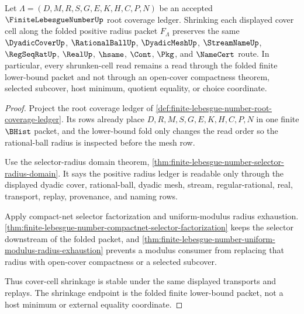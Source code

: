 \begin{theorem}
\label{thm:finite-lebesgue-number-cover-shrinkage-stability}
Let $\Lambda=(D,M,R,S,G,E,K,H,C,P,N)$ be an accepted $\FiniteLebesgueNumberUp$ root coverage ledger. Shrinking each displayed cover cell along the folded positive radius packet $F_\Lambda$ preserves the same $\DyadicCoverUp$, $\RationalBallUp$, $\DyadicMeshUp$, $\StreamNameUp$, $\RegSeqRatUp$, $\RealUp$, $\hsame$, $\Cont$, $\Pkg$, and $\NameCert$ route. In particular, every shrunken-cell read remains a read through the folded finite lower-bound packet and not through an open-cover compactness theorem, selected subcover, host minimum, quotient equality, or choice coordinate.
\end{theorem}
\begin{proof}
Project the root coverage ledger of \autoref{def:finite-lebesgue-number-root-coverage-ledger}. Its rows already place $D,R,M,S,G,E,K,H,C,P,N$ in one finite $\BHist$ packet, and the lower-bound fold only changes the read order so the rational-ball radius is inspected before the mesh row.

Use the selector-radius domain theorem, \autoref{thm:finite-lebesgue-number-selector-radius-domain}. It says the positive radius ledger is readable only through the displayed dyadic cover, rational-ball, dyadic mesh, stream, regular-rational, real, transport, replay, provenance, and naming rows.

Apply compact-net selector factorization and uniform-modulus radius exhaustion. \autoref{thm:finite-lebesgue-number-compactnet-selector-factorization} keeps the selector downstream of the folded packet, and \autoref{thm:finite-lebesgue-number-uniform-modulus-radius-exhaustion} prevents a modulus consumer from replacing that radius with open-cover compactness or a selected subcover.

Thus cover-cell shrinkage is stable under the same displayed transports and replays. The shrinkage endpoint is the folded finite lower-bound packet, not a host minimum or external equality coordinate.
\end{proof}

